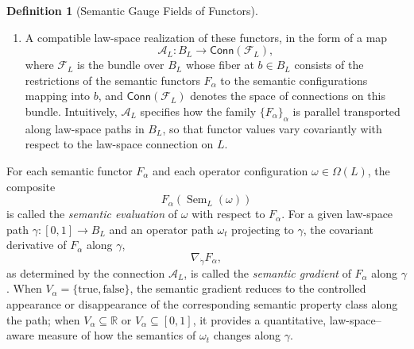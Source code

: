 \documentclass[11pt]{book}
\theoremstyle{plain}
\theoremstyle{definition}
\newtheorem{definition}[theorem]{Definition}
\theoremstyle{remark}
\begin{document}
\begin{definition}[Semantic Gauge Fields of Functors]
\begin{enumerate}
  \item A compatible law-space realization of these functors, in the form
        of a map
        \[
          \mathcal{A}_L :
          B_L \longrightarrow \mathsf{Conn}(\mathcal{F}_L),
        \]
        where $\mathcal{F}_L$ is the bundle over $B_L$ whose fiber at
        $b\in B_L$ consists of the restrictions of the semantic functors
        $F_\alpha$ to the semantic configurations mapping into $b$, and
        $\mathsf{Conn}(\mathcal{F}_L)$ denotes the space of connections
        on this bundle. Intuitively, $\mathcal{A}_L$ specifies how the
        family $\{F_\alpha\}_\alpha$ is parallel transported along
        law-space paths in $B_L$, so that functor values vary
        covariantly with respect to the law-space connection on $L$.
\end{enumerate}
For each semantic functor $F_\alpha$ and each operator configuration
$\omega\in\Omega(L)$, the composite
\[
  F_\alpha(\operatorname{Sem}_L(\omega))
\]
is called the \emph{semantic evaluation} of $\omega$ with respect to
$F_\alpha$. For a given law-space path $\gamma:[0,1]\to B_L$ and an
operator path $\omega_t$ projecting to $\gamma$, the covariant derivative
of $F_\alpha$ along $\gamma$,
\[
  \nabla_{\dot{\gamma}} F_\alpha,
\]
as determined by the connection $\mathcal{A}_L$, is called the
\emph{semantic gradient} of $F_\alpha$ along $\gamma$. When
$V_\alpha=\{\mathrm{true},\mathrm{false}\}$, the semantic gradient reduces
to the controlled appearance or disappearance of the corresponding
semantic property class along the path; when $V_\alpha\subseteq\mathbb{R}$
or $V_\alpha\subseteq[0,1]$, it provides a quantitative, law-space–aware
measure of how the semantics of $\omega_t$ changes along $\gamma$.

\end{definition}
\end{document}
